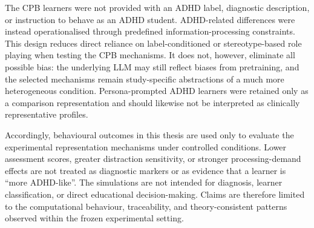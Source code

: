 The CPB learners were not provided with an ADHD label, diagnostic description, or instruction to behave as an ADHD student. ADHD-related differences were instead operationalised through predefined information-processing constraints. This design reduces direct reliance on label-conditioned or stereotype-based role playing when testing the CPB mechanisms. It does not, however, eliminate all possible bias: the underlying LLM may still reflect biases from pretraining, and the selected mechanisms remain study-specific abstractions of a much more heterogeneous condition. Persona-prompted ADHD learners were retained only as a comparison representation and should likewise not be interpreted as clinically representative profiles.

Accordingly, behavioural outcomes in this thesis are used only to evaluate the experimental representation mechanisms under controlled conditions. Lower assessment scores, greater distraction sensitivity, or stronger processing-demand effects are not treated as diagnostic markers or as evidence that a learner is ``more ADHD-like''. The simulations are not intended for diagnosis, learner classification, or direct educational decision-making. Claims are therefore limited to the computational behaviour, traceability, and theory-consistent patterns observed within the frozen experimental setting.
\endgroup
\fussy
